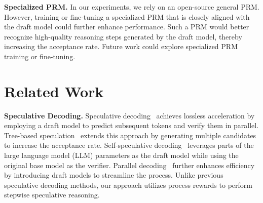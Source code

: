 \documentclass{article}
\theoremstyle{plain}
\theoremstyle{definition}
\theoremstyle{remark}
\begin{document}
\textbf{Specialized PRM.} In our experiments, we rely on an open-source general PRM. However, training or fine-tuning a specialized PRM that is closely aligned with the draft model could further enhance performance. Such a PRM would better recognize high-quality reasoning steps generated by the draft model, thereby increasing the acceptance rate. Future work could explore specialized PRM training or fine-tuning.


\section{Related Work} %
\label{sec:related_works}
\textbf{Speculative Decoding.} Speculative decoding~\citep{stern2018blockwise,leviathan2023fast,xia2024unlocking,chen2023accelerating,zhang2023draft,sun2024triforce,chen2023cascade,li2024eagle} achieves lossless acceleration by employing a draft model to predict subsequent tokens and verify them in parallel. Tree-based speculation~\citep{miao2024specinfer,fu2024break,sun2024spectr,chen2024sequoia} extends this approach by generating multiple candidates to increase the acceptance rate. Self-speculative decoding~\citep{elhoushi2024layer,zhang2023draft} leverages parts of the large language model (LLM) parameters as the draft model while using the original base model as the verifier. Parallel decoding~\citep{stern2018blockwise,cai2024medusa} further enhances efficiency by introducing draft models to streamline the process. Unlike previous speculative decoding methods, our approach utilizes process rewards to perform stepwise speculative reasoning.
\end{document}
